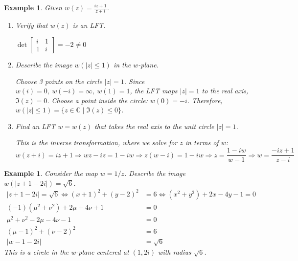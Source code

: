 \documentclass{article}
\newtheorem{example}[theorem]{Example}
\theoremstyle{definition}
\begin{document}
\begin{example} \normalfont
    Given $w(z) = \frac{iz+1}{z+i}$.
    \begin{enumerate}
        \item[(i)] Verify that $w(z)$ is an LFT.
 
        $\det \begin{bmatrix}
            i & 1 \\ 1 & i
        \end{bmatrix} = -2 \neq 0$
        \item[(ii)] Describe the image $w(|z| \leq 1)$ in the $w$-plane.
        
        Choose 3 points on the circle $|z| = 1$. Since $w(i) = 0,\ w(-i) = \infty,\ w(1) = 1$, the LFT maps $|z| = 1$ to the real axis, $\Im(z) = 0$. Choose a point inside the circle: $w(0) = -i$. Therefore, $w(|z| \leq 1) = \{ z \in \mathbb{C} \mid \Im(z) \leq 0 \}$.

        \item[(iii)] Find an LFT $w=w(z)$ that takes the real axis to the unit circle $|z|=1$.

        This is the inverse transformation, where we solve for $z$ in terms of $w$:
        \begin{equation*}
            w(z+i) = iz + 1 \Longrightarrow wz - iz = 1 - iw \Longrightarrow z(w-i) = 1 - iw \Longrightarrow z = \frac{1-iw}{w-1} \Longrightarrow w = \frac{-iz + 1}{z-i}
        \end{equation*}
    \end{enumerate}
\end{example}

\begin{example} \normalfont
    Consider the map $w = 1/z$. Describe the image $w(|z+1-2i|) = \sqrt{6}$.
    \begin{align*}
        |z+1-2i| = \sqrt{6} \iff (x+1)^2 + (y-2)^2 &= 6 \iff (x^2+y^2) + 2x - 4y - 1 = 0 \\
        (-1)(\mu^2 + \nu^2) + 2\mu + 4 \nu + 1 &= 0\\
        \mu^2 + \nu^2 - 2\mu - 4\nu - 1 &= 0 \\
        (\mu - 1)^2 + (\nu - 2)^2 &= 6 \\
        |w - 1 - 2i| &= \sqrt{6}
    \end{align*}
    This is a circle in the $w$-plane centered at $(1, 2i)$ with radius $\sqrt{6}$.
\end{example}
\end{document}
